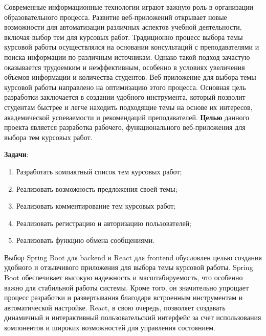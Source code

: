 \documentclass[14pt]{extarticle} %
\begin{document}
	

\renewcommand{\baselinestretch}{1.5}
\normalsize
\renewcommand{\contentsname}{СОДЕРЖАНИЕ}
\noindent\tableofcontents


Современные информационные технологии играют важную роль в организации образовательного процесса. Развитие веб-приложений открывает новые возможности для автоматизации различных аспектов учебной деятельности, включая выбор тем для курсовых работ. Традиционно процесс выбора темы курсовой работы осуществлялся на основании консультаций с преподавателями и поиска информации по различным источникам. Однако такой подход зачастую оказывается трудоемким и неэффективным, особенно в условиях увеличения объемов информации и количества студентов.
Веб-приложение для выбора темы курсовой работы направлено на оптимизацию этого процесса. Основная цель разработки заключается в создании удобного инструмента, который позволит студентам быстрее и легче находить подходящие темы на основе их интересов, академической успеваемости и рекомендаций преподавателей. 
\textbf{Целью} данного проекта является разработка рабочего, функционального веб-приложения для выбора тем курсовых работ.


\textbf{Задачи}:
\begin{enumerate}
    \item Разработать компактный список тем курсовых работ;
    \item Реализовать возможность предложения своей темы;
    \item Реализовать комментирование тем курсовых работ;
    \item Реализовать регистрацию и авторизацию пользователей;
    \item Реализовать функцию обмена сообщениями.
\end{enumerate}
\newpage

Выбор Spring Boot для backend и React для frontend обусловлен целью создания удобного и отзывчивого приложения для выбора темы курсовой работы. Spring Boot обеспечивает высокую надежность и масштабируемость, что особенно важно для стабильной работы системы. Кроме того, он значительно упрощает процесс разработки и развертывания благодаря встроенным инструментам и автоматической настройке. React, в свою очередь, позволяет создавать динамичный и интерактивный пользовательский интерфейс за счет использования компонентов и широких возможностей для управления состоянием.
\end{document}
